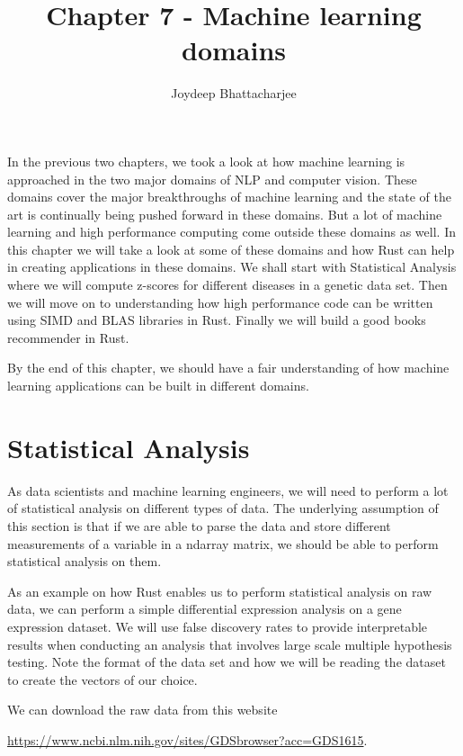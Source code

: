 \documentclass{book}
\begin{document}
\title{Chapter 7 - Machine learning domains}
\author {Joydeep Bhattacharjee}

\maketitle

In the previous two chapters, we took a look at how machine learning is approached in the two major domains of NLP and computer vision. These domains cover the major breakthroughs of machine learning and the state of the art is continually being pushed forward in these domains. But a lot of machine learning and high performance computing come outside these domains as well. In this chapter we will take a look at some of these domains and how Rust can help in creating applications in these domains. We shall start with Statistical Analysis where we will compute z-scores for different diseases in a genetic data set. Then we will move on to understanding how high performance code can be written using SIMD and BLAS libraries in Rust. Finally we will build a good books recommender in Rust.

By the end of this chapter, we should have a fair understanding of how machine learning applications can be built in different domains.

\section{Statistical Analysis}%
As data scientists and machine learning engineers, we will need to perform a lot of statistical analysis on different types of data. The underlying assumption of this section is that if we are able to parse the data and store different measurements of a variable in a ndarray matrix, we should be able to perform statistical analysis on them.

As an example on how Rust enables us to perform statistical analysis on raw data, we can perform a simple differential expression analysis on a gene expression dataset. We will use false discovery rates to provide interpretable results when conducting an analysis that involves large scale multiple hypothesis testing. Note the format of the data set and how we will be reading the dataset to create the vectors of our choice.

We can download the raw data from this website

\href{https://www.ncbi.nlm.nih.gov/sites/GDSbrowser?acc=GDS1615}{https://www.ncbi.nlm.nih.gov/sites/GDSbrowser?acc=GDS1615}.
\end{document}
